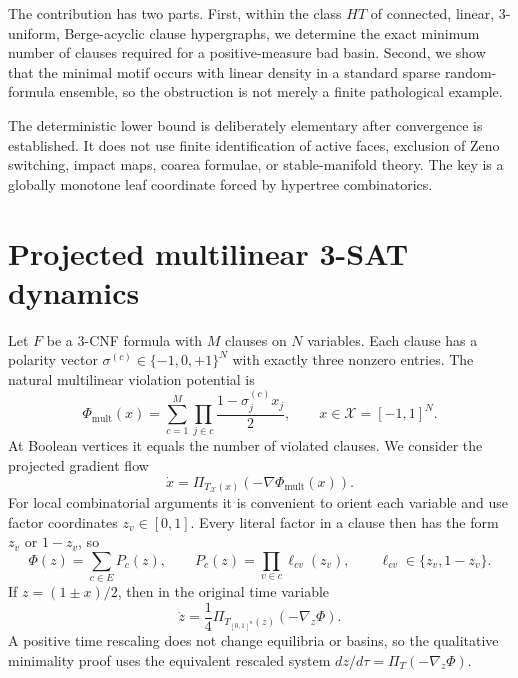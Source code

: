\documentclass[11pt,a4paper]{article}
\begin{document}
The contribution has two parts. First, within the class $HT$ of connected, linear, 3-uniform, Berge-acyclic clause hypergraphs, we determine the exact minimum number of clauses required for a positive-measure bad basin. Second, we show that the minimal motif occurs with linear density in a standard sparse random-formula ensemble, so the obstruction is not merely a finite pathological example.

The deterministic lower bound is deliberately elementary after convergence is established. It does not use finite identification of active faces, exclusion of Zeno switching, impact maps, coarea formulae, or stable-manifold theory. The key is a globally monotone leaf coordinate forced by hypertree combinatorics.
\section{Projected multilinear 3-SAT dynamics}
Let $F$ be a 3-CNF formula with $M$ clauses on $N$ variables. Each clause has a polarity vector $\sigma^{(c)}\in\{-1,0,+1\}^N$ with exactly three nonzero entries. The natural multilinear violation potential is
\begin{equation}
\Phi_{\mathrm{mult}}(x)=\sum_{c=1}^M\prod_{j\in c}\frac{1-\sigma_j^{(c)}x_j}{2},\qquad x\in\mathcal X=[-1,1]^N.
\end{equation}
At Boolean vertices it equals the number of violated clauses. We consider the projected gradient flow
\begin{equation}
\dot x=\Pi_{T_{\mathcal X}(x)}(-\nabla\Phi_{\mathrm{mult}}(x)).
\end{equation}
For local combinatorial arguments it is convenient to orient each variable and use factor coordinates $z_v\in[0,1]$. Every literal factor in a clause then has the form $z_v$ or $1-z_v$, so
\[
\Phi(z)=\sum_{c\in E}P_c(z),\qquad P_c(z)=\prod_{v\in c}\ell_{cv}(z_v),\qquad \ell_{cv}\in\{z_v,1-z_v\}.
\]
If $z=(1\pm x)/2$, then in the original time variable
\begin{equation}
\dot z=\frac14\Pi_{T_{[0,1]^n}(z)}(-\nabla_z\Phi).
\end{equation}
A positive time rescaling does not change equilibria or basins, so the qualitative minimality proof uses the equivalent rescaled system $dz/d\tau=\Pi_T(-\nabla_z\Phi)$.
\end{document}
